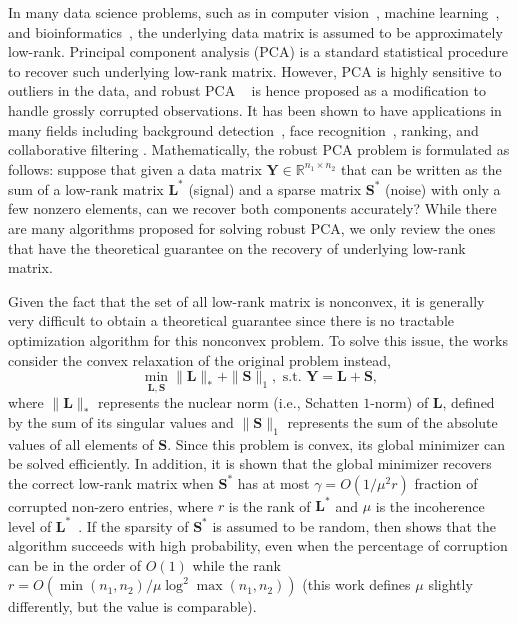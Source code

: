 \documentclass[12pt]{article}
\newcommand{\bL}{\boldsymbol{L}}
\def\reals{\mathbb{R}}
\def\bS{\boldsymbol{S}}
\def\bY{\boldsymbol{Y}}
\theoremstyle{plain}
\theoremstyle{definition}
\theoremstyle{plain}
\theoremstyle{plain}
\theoremstyle{remark}
\begin{document}
In many data science problems, such as in computer vision~\cite{Epstein95,Ho03}, machine learning~\cite{ASI:ASI1}, and bioinformatics~\cite{Price2006}, the underlying data matrix is assumed to be approximately low-rank. Principal component analysis (PCA) is a standard statistical procedure to recover such underlying low-rank matrix. However, PCA is highly sensitive to outliers in the data, and robust PCA ~\cite{robust_pca09,Chandrasekaran_Sanghavi_Parrilo_Willsky_2009,Clarkson:2013:LRA:2488608.2488620,Frieze:2004:FMA:1039488.1039494,Bhojanapalli:2015:TLA:2722129.2722191,DBLP:conf/nips/YiPCC16,ChenWainwright2015,conf/aistats/GuWL16,DBLP:journals/corr/CherapanamjeriG16,NIPS2014_5430} is hence proposed as a modification to handle grossly corrupted observations. It has been shown to have applications in many fields including background detection~\cite{Li_backgroundsubtraction}, face recognition~\cite{Basri03}, ranking, and collaborative filtering \cite{robust_pca09}. Mathematically, the robust PCA problem is formulated as follows: suppose that given a data matrix $\bY\in\reals^{n_1\times n_2}$ that can be written as the sum of a low-rank matrix $\bL^*$ (signal) and a sparse matrix $\bS^*$ (noise) with only a few nonzero elements, can we recover both components accurately? While there are many algorithms proposed for solving robust PCA, we only review the ones that have the theoretical guarantee on the recovery of underlying low-rank matrix. 

Given the fact that the set of all low-rank matrix is nonconvex, it is generally very difficult to obtain a theoretical guarantee since there is no tractable optimization algorithm for this nonconvex problem. To solve this issue, the works \cite{robust_pca09,Chandrasekaran_Sanghavi_Parrilo_Willsky_2009} consider the convex relaxation of the original problem instead,
\begin{equation}\label{eq:convex}
\min_{\bL,\bS}\|\bL\|_*+\|\bS\|_1,\,\,\text{s.t. $\bY=\bL+\bS$},
\end{equation}
where $\|\bL\|_*$ represents the nuclear norm (i.e., Schatten $1$-norm) of $\bL$, defined by the sum of its singular values and $\|\bS\|_1$ represents the sum of the absolute values of all elements of $\bS$. Since this problem is convex, its global minimizer can be solved efficiently. In addition, it is shown that the global minimizer recovers the correct low-rank matrix when $\bS^*$ has at most $\gamma=O(1/\mu^2r)$ fraction of corrupted non-zero entries, where $r$ is the rank of $\bL^*$ and $\mu$ is the incoherence level of $\bL^*$~\cite{5934412}. If the sparsity of $\bS^*$ is assumed to be random, then \cite{robust_pca09} shows that the algorithm succeeds with high probability, even when the percentage of corruption can be in the order of $O(1)$ while the rank $r=O(\min(n_1,n_2)/\mu\log^2\max(n_1,n_2))$ (this work defines $\mu$ slightly differently, but the value is comparable).
\end{document}
